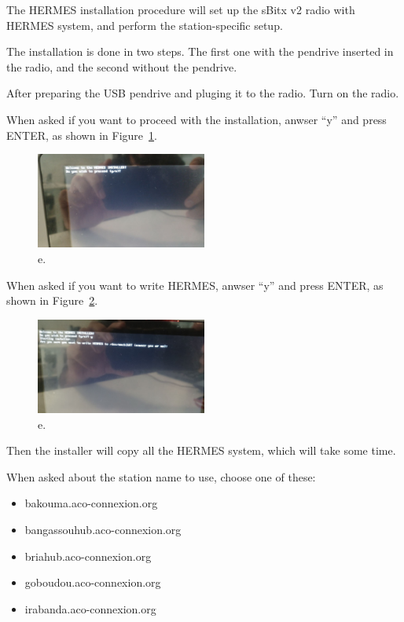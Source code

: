 \documentclass[11pt,a4paper]{article}
\begin{document}
The HERMES installation procedure will set up the sBitx v2 radio with HERMES system,
and perform the station-specific setup.

The installation is done in two steps. The first one with the
pendrive inserted in the radio, and the second without the pendrive.

After preparing the USB pendrive and pluging it to the radio. Turn on the radio.

When asked if you want to proceed with the installation, anwser ``y'' and press ENTER, as shown in Figure~\ref{fig:inst1}.

\begin{figure}[H]
  \centering
  \includegraphics[width=0.5\textwidth]{pictures/inst-1.jpg}
  \caption{e.}
  \label{fig:inst1}
\end{figure}

When asked if you want to write HERMES, anwser ``y'' and press ENTER, as shown in Figure~\ref{fig:inst2}.

\begin{figure}[H]
  \centering
  \includegraphics[width=0.5\textwidth]{pictures/inst-2.jpg}
  \caption{e.}
  \label{fig:inst2}
\end{figure}

Then the installer will copy all the HERMES system, which will take some time.



When asked about the station name to use, choose one of these:
\begin{itemize}
\item bakouma.aco-connexion.org
\item bangassouhub.aco-connexion.org
\item briahub.aco-connexion.org
\item goboudou.aco-connexion.org
\item irabanda.aco-connexion.org
\end{itemize}
\end{document}
